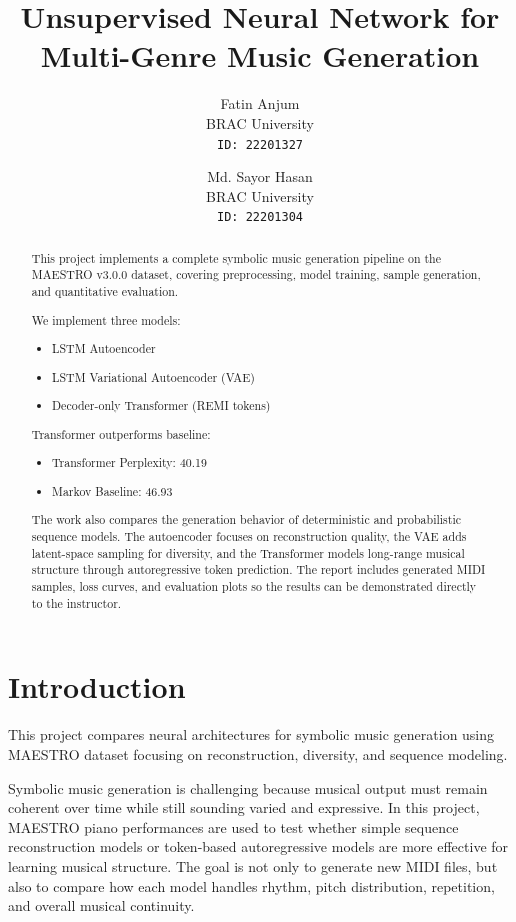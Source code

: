 \documentclass{article}
\title{Unsupervised Neural Network for Multi-Genre Music Generation}
\author{
Fatin Anjum \\
BRAC University \\
\texttt{ID: 22201327}
\and
Md. Sayor Hasan \\
BRAC University \\
\texttt{ID: 22201304}
}
\begin{document}
\maketitle

\begin{abstract}
This project implements a complete symbolic music generation pipeline on the MAESTRO v3.0.0 dataset, covering preprocessing, model training, sample generation, and quantitative evaluation.

We implement three models:
\begin{itemize}
    \item LSTM Autoencoder
    \item LSTM Variational Autoencoder (VAE)
    \item Decoder-only Transformer (REMI tokens)
\end{itemize}

Transformer outperforms baseline:
\begin{itemize}
    \item Transformer Perplexity: 40.19
    \item Markov Baseline: 46.93
\end{itemize}

The work also compares the generation behavior of deterministic and probabilistic sequence models. The autoencoder focuses on reconstruction quality, the VAE adds latent-space sampling for diversity, and the Transformer models long-range musical structure through autoregressive token prediction. The report includes generated MIDI samples, loss curves, and evaluation plots so the results can be demonstrated directly to the instructor.
\end{abstract}

\section{Introduction}
This project compares neural architectures for symbolic music generation using MAESTRO dataset focusing on reconstruction, diversity, and sequence modeling.

Symbolic music generation is challenging because musical output must remain coherent over time while still sounding varied and expressive. In this project, MAESTRO piano performances are used to test whether simple sequence reconstruction models or token-based autoregressive models are more effective for learning musical structure. The goal is not only to generate new MIDI files, but also to compare how each model handles rhythm, pitch distribution, repetition, and overall musical continuity.
\end{document}
